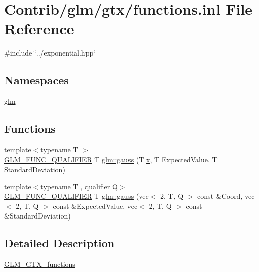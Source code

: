 \hypertarget{functions_8inl}{}\section{Contrib/glm/gtx/functions.inl File Reference}
\label{functions_8inl}
{\ttfamily \#include \char`\"{}../exponential.\+hpp\char`\"{}}\newline
\subsection*{Namespaces}
\begin{DoxyCompactItemize}
\item 
 \mbox{\hyperlink{namespaceglm}{glm}}
\end{DoxyCompactItemize}
\subsection*{Functions}
\begin{DoxyCompactItemize}
\item 
{\footnotesize template$<$typename T $>$ }\\\mbox{\hyperlink{setup_8hpp_a33fdea6f91c5f834105f7415e2a64407}{G\+L\+M\+\_\+\+F\+U\+N\+C\+\_\+\+Q\+U\+A\+L\+I\+F\+I\+ER}} T \mbox{\hyperlink{group__gtx__functions_ga0b50b197ff74261a0fad90f4b8d24702}{glm\+::gauss}} (T \mbox{\hyperlink{_s_d_l__opengl_8h_ad0e63d0edcdbd3d79554076bf309fd47}{x}}, T Expected\+Value, T Standard\+Deviation)
\item 
{\footnotesize template$<$typename T , qualifier Q$>$ }\\\mbox{\hyperlink{setup_8hpp_a33fdea6f91c5f834105f7415e2a64407}{G\+L\+M\+\_\+\+F\+U\+N\+C\+\_\+\+Q\+U\+A\+L\+I\+F\+I\+ER}} T \mbox{\hyperlink{group__gtx__functions_gad19ec8754a83c0b9a8dc16b7e60705ab}{glm\+::gauss}} (vec$<$ 2, T, Q $>$ const \&Coord, vec$<$ 2, T, Q $>$ const \&Expected\+Value, vec$<$ 2, T, Q $>$ const \&Standard\+Deviation)
\end{DoxyCompactItemize}


\subsection{Detailed Description}
\mbox{\hyperlink{group__gtx__functions}{G\+L\+M\+\_\+\+G\+T\+X\+\_\+functions}} 
